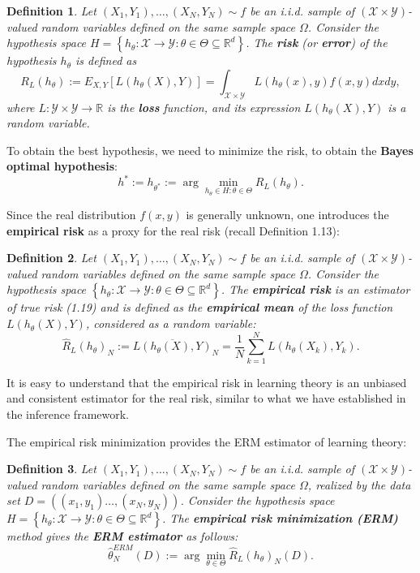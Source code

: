 \documentclass{report}
\newtheorem{definition}{Definition}[chapter]
\begin{document}
 \begin{definition}
Let $(X_1, Y_1),\dots,(X_N, Y_N) \sim f$ be an i.i.d. sample of $(\mathcal{X} \times \mathcal{Y})$-valued random variables defined on the same sample space $\Omega$. Consider the hypothesis space $H = \left\{h_\theta : \mathcal{X} \to \mathcal{Y} :\theta\in\Theta\subseteq\mathbb{R}^d\right\}$. The \textbf{risk} (or \textbf{error}) of the hypothesis $h_\theta$ is defined as
\begin{equation}
R_L(h_\theta) := E_{X,Y}[L(h_\theta(X),Y)] = \int_{\mathcal{X} \times \mathcal{Y}} L(h_\theta(x),y)f(x,y)dxdy,
\end{equation}
where $L :\mathcal{Y} \times \mathcal{Y} \to \mathbb{R}$ is the \textbf{loss} function, and its expression $L(h_\theta(X), Y)$ is a random variable.  
\end{definition}

To obtain the best hypothesis, we need to minimize the risk, to obtain the \textbf{Bayes optimal hypothesis}: 
\begin{equation}
h^* := h_{\theta^*} := \arg \min_{h_\theta \in H : \theta \in \Theta} R_L(h_\theta). 
\end{equation}

Since the real distribution $f(x,y)$ is generally unknown, one introduces the \textbf{empirical risk} as a proxy for the real risk (recall Definition 1.13):
\begin{definition}
Let $(X_1, Y_1),\dots,(X_N, Y_N) \sim f$ be an i.i.d. sample of $(\mathcal{X} \times \mathcal{Y})$-valued random variables defined on the same sample space $\Omega$. Consider the hypothesis space $\left\{h_\theta : \mathcal{X} \to \mathcal{Y} :\theta\in\Theta\subseteq\mathbb{R}^d\right\}$. The \textbf{empirical risk} is an estimator of true risk (1.19) and is defined as the \textbf{empirical mean} of the loss function $L(h_\theta(X), Y)$, considered as a random variable:
\begin{equation}
\hat{R}_L(h_\theta)_N := \overline{L(h_\theta(X),Y)}_N = \frac{1}{N}\sum_{k=1}^{N}L(h_\theta(X_k),Y_k).
\end{equation}
\end{definition}

It is easy to understand that the empirical risk in learning theory is an unbiased and consistent estimator for the real risk, similar to what we have established in the inference framework.

The empirical risk minimization provides the ERM estimator of learning theory:
\begin{definition}
Let $(X_1, Y_1),\dots,(X_N, Y_N) \sim f$ be an i.i.d. sample of $(\mathcal{X} \times \mathcal{Y})$-valued random variables defined on the same sample space $\Omega$, realized by the data set $D =((x_1, y_1)\dots,(x_N,y_N))$. Consider the hypothesis space $H = \left\{h_\theta : \mathcal{X} \to \mathcal{Y} :\theta\in\Theta\subseteq\mathbb{R}^d\right\}$. The \textbf{empirical risk minimization (ERM)} method gives the \textbf{ERM estimator} as follows:
\begin{equation}
\hat{\theta}^{ERM}_N(D) := \arg\min_{\theta \in \Theta}\hat{R}_L(h_\theta)_N(D).
\end{equation}
\end{definition}
\end{document}
